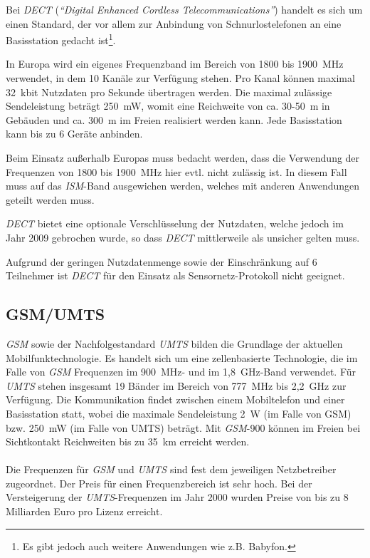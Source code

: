         Bei \emph{DECT} (\emph{"`Digital Enhanced Cordless Telecommunications"'}) handelt es sich um einen Standard, 
        der vor allem zur Anbindung von Schnurlostelefonen an eine Basisstation gedacht ist\footnote{Es gibt
        jedoch auch weitere Anwendungen wie z.B. Babyfon.}. 

        In Europa wird ein eigenes Frequenzband im Bereich von 1800 bis 1900~MHz verwendet, in dem 10 
        Kanäle zur Verfügung stehen. Pro Kanal können maximal 32~kbit Nutzdaten pro Sekunde übertragen
        werden. Die maximal zulässige Sendeleistung beträgt 250~mW, womit eine Reichweite von ca. 30-50~m 
        in Gebäuden und ca. 300~m im Freien realisiert werden kann. Jede Basisstation kann
        bis zu 6 Geräte anbinden.

        Beim Einsatz außerhalb Europas muss bedacht werden, dass die Verwendung der Frequenzen von
        1800 bis 1900~MHz hier evtl. nicht zulässig ist. In diesem Fall muss auf das \emph{ISM}-Band 
        ausgewichen werden, welches  mit anderen Anwendungen geteilt werden muss.

        \emph{DECT} bietet eine optionale Verschlüsselung der Nutzdaten, welche jedoch im Jahr 2009 gebrochen 
        wurde, so dass \emph{DECT} mittlerweile als unsicher gelten muss.

        Aufgrund der geringen Nutzdatenmenge sowie der Einschränkung auf 6 Teilnehmer ist
        \emph{DECT} für den Einsatz als Sensornetz-Protokoll nicht geeignet.

    \subsection{GSM/UMTS}
        \emph{GSM} sowie der Nachfolgestandard \emph{UMTS} bilden die Grundlage der aktuellen Mobilfunktechnologie.
        Es handelt sich um eine zellenbasierte Technologie, die im Falle von \emph{GSM} Frequenzen im
        900~MHz- und im 1,8~GHz-Band verwendet. Für \emph{UMTS} stehen insgesamt 19 Bänder im Bereich von 777~MHz 
        bis 2,2~GHz zur Verfügung. Die Kommunikation findet zwischen einem Mobiltelefon und einer
        Basisstation statt, wobei die maximale Sendeleistung 2~W (im Falle von GSM) bzw. 250~mW (im Falle
        von UMTS) beträgt. Mit \emph{GSM}-900 können im Freien bei Sichtkontakt Reichweiten bis zu 35~km erreicht
        werden.\\
        \\
        Die Frequenzen für \emph{GSM} und \emph{UMTS} sind fest dem jeweiligen Netzbetreiber zugeordnet. Der Preis
        für einen Frequenzbereich ist sehr hoch. Bei der Versteigerung der \emph{UMTS}-Frequenzen im 
        Jahr 2000 wurden Preise von bis zu 8 Milliarden Euro pro Lizenz erreicht. 

